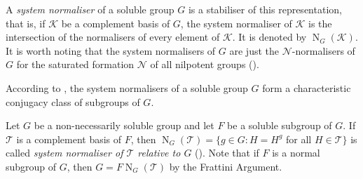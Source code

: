 \documentclass[12pt,a4paper]{article}
\DeclareMathOperator{\N}{N}
\newtheorem{lemma}[theorem]{Lemma}
\theoremstyle{definition}
\begin{document}
A \emph{system normaliser} of a soluble group $G$ is a stabiliser of this representation, that is, if  $\mathcal{K}$ be a complement basis of $G$, the system normaliser of $\mathcal{K}$ is  the intersection of the normalisers of every element of $\mathcal{K}$. It is denoted by $\N_G(\mathcal{K})$. It is worth noting that the system normalisers of $G$ are just the $\mathcal{N}$-normalisers of $G$ for the saturated formation $\mathcal{N}$ of all nilpotent groups (\cite[Section~3]{DoerkHawkes1992}).


According to \cite[Theorem~I.5.2]{DoerkHawkes1992}, the system normalisers of a soluble group $G$ form a characteristic conjugacy class of subgroups of $G$.

Let $G$ be a non-necessarily soluble group and let $F$ be a soluble subgroup of $G$. If $\mathcal{T}$ is a complement basis of $F$, then $\N_G(\mathcal{T}) = \{g \in G : H = H^g$ for all   $H \in \mathcal{T}\}$ is called \emph{system normaliser of $\mathcal{T}$  relative to $G$} (\cite{Hall1940}). Note that if $F$ is a normal subgroup of $G$, then $G = F\N_G(\mathcal{T})$ by the Frattini Argument.





\end{document}
